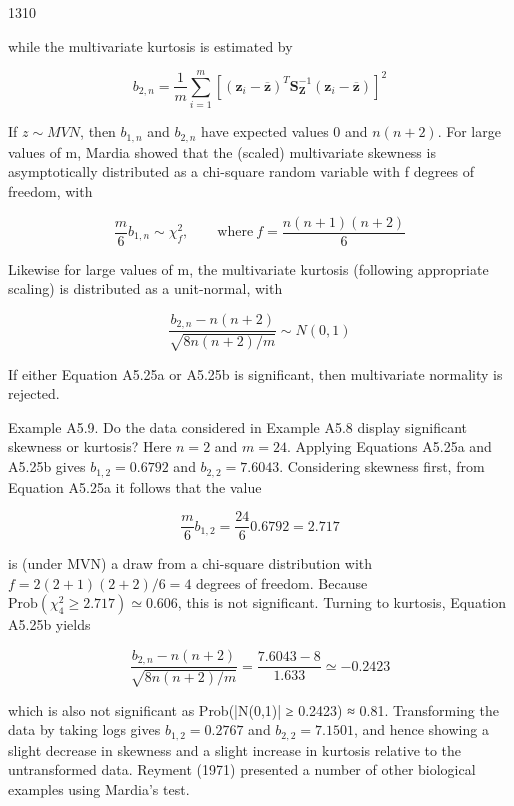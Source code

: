 \documentclass{article}
\begin{document}
1310

while the multivariate kurtosis is estimated by

\begin{equation}
b_{2,n}=\frac{1}{m}\sum_{i=1}^{m}\left[\left(\mathbf{z}_{i}-\overline{\mathbf{z}}\right)^{T}\mathbf{S}_{\mathbf{Z}}^{-1}\left(\mathbf{z}_{i}-\overline{\mathbf{z}}\right)\right]^{2}
\end{equation}

If  $ z \sim MVN $, then  $ b_{1,n} $ and  $ b_{2,n} $ have expected values 0 and  $ n(n+2) $. For large values of m, Mardia showed that the (scaled) multivariate skewness is asymptotically distributed as a chi-square random variable with f degrees of freedom, with

\begin{equation}
\frac{m}{6}b_{1,n}\sim\chi_{f}^{2},\qquad\mathrm{w h e r e~}f=\frac{n(n+1)(n+2)}{6}
\end{equation}

Likewise for large values of m, the multivariate kurtosis (following appropriate scaling) is distributed as a unit-normal, with

\begin{equation}
\frac{b_{2,n}-n(n+2)}{\sqrt{8n(n+2)/m}}\sim N(0,1)
\end{equation}

If either Equation A5.25a or A5.25b is significant, then multivariate normality is rejected.

Example A5.9. Do the data considered in Example A5.8 display significant skewness or kurtosis? Here $n = 2$ and $m = 24$. Applying Equations A5.25a and A5.25b gives $b_{1,2} = 0.6792$ and $b_{2,2} = 7.6043$. Considering skewness first, from Equation A5.25a it follows that the value

\begin{equation}
\frac{m}{6}b_{1,2}=\frac{24}{6}0.6792=2.717
\end{equation}

is (under MVN) a draw from a chi-square distribution with  $ f = 2(2 + 1)(2 + 2)/6 = 4 $ degrees of freedom. Because  $ \text{Prob}(\chi_4^2 \geq 2.717) \simeq 0.606 $, this is not significant. Turning to kurtosis, Equation A5.25b yields

\begin{equation}
\frac{b_{2,n}-n(n+2)}{\sqrt{8n(n+2)/m}}=\frac{7.6043-8}{1.633}\simeq-0.2423
\end{equation}

which is also not significant as Prob(|N(0,1)| ≥ 0.2423) ≈ 0.81. Transforming the data by taking logs gives  $ b_{1,2} = 0.2767 $ and  $ b_{2,2} = 7.1501 $, and hence showing a slight decrease in skewness and a slight increase in kurtosis relative to the untransformed data. Reyment (1971) presented a number of other biological examples using Mardia's test.
\end{document}
